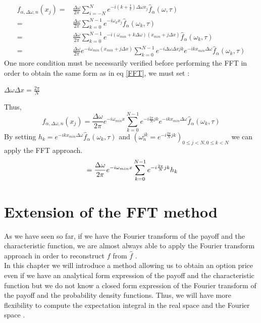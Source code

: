 \documentclass[12pt]{report}
\begin{document}
\begin{align}
f_{\alpha,\Delta \omega, n}(x_j)=&\frac{\Delta \omega}{2\pi} \sum \limits_{i=-N}^N e^{-i(k+\frac{1}{2} ) \Delta \omega x_j }\hat{f}_{\alpha}(\omega,\tau) \nonumber
\\=& \frac{\Delta \omega}{2\pi} \sum \limits_{k=0}^{N-1} e^{-i \omega_k x_j }\hat{f}_{\alpha}(\omega_k,\tau) \nonumber
\\=& \frac{\Delta \omega}{2\pi} \sum \limits_{k=0}^{N-1} e^{-i (\omega_{min}+k\Delta \omega )  (x_{min}+j\Delta x) }\hat{f}_{\alpha}(\omega_k,\tau) \nonumber
\\=&\frac{\Delta \omega}{2\pi}
\label{fret}e^{-i \omega_{min} (x_{min}+j\Delta x) } \sum \limits_{k=0}^{N-1} e^{-i\Delta \omega \Delta x j k} e^{-i k x_{min} \Delta \omega}\hat{f}_{\alpha}(\omega_k,\tau) \nonumber
\end{align}
One more condition must be necessarily verified before performing the FFT in order to obtain the same form as in eq \eqref{FFT}, we must set :
\begin{center}
$\Delta \omega \Delta x = \frac{2 \pi}{N}$
\end{center} 
Thus, \\
\begin{equation*}
f_{\alpha,\Delta \omega, n}(x_j)=\frac{\Delta \omega}{2\pi} e^{-i \omega_{min} x} \sum \limits_{k=0}^{N-1} e^{-i\frac{2 \pi}{N}j k} e^{-i k x_{min} \Delta \omega}\hat{f}_{\alpha}(\omega_k,\tau) 
\end{equation*}
By setting $h_k=  e^{-i k x_{min} \Delta \omega } \hat{f}_{\alpha}(\omega_k,\tau)$ and $(\omega_n^{j k}= e^{-i \frac{2\pi}{N}j k })_{0 \le j<N , 0 \le k<N}$ we can apply the FFT approach.
\begin{equation}
\\=\frac{\Delta \omega}{2\pi} e^{-i \omega_{min} x} \sum \limits_{k=0}^{N-1} e^{-i\frac{2 \pi}{N}j k} h_k
\label{4.14}
\end{equation}

\chapter{Extension of the FFT method }

As we have seen so far, if we have the Fourier transform of the payoff and the characteristic function, we are almost always able to apply the Fourier transform approach in order to reconstruct $f$ from $\hat f$ .\\


In this chapter we will introduce a method allowing us to obtain an option price even if we have an analytical form expression of the payoff and the characteristic function but we do not know a closed form expression of the Fourier transform of the payoff and the probability density functions. Thus, we will have more flexibility to compute the expectation integral in the real space and the Fourier space .\\ 
\end{document}
